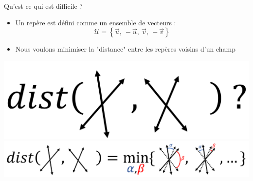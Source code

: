 \begin{frame}{Qu'est ce qui est difficile ?}
    \centering
    \small
    \begin{itemize}
     \item Un repère est défini comme un ensemble de vecteurs : $$\mathcal{U} = \left\{\vec{u},\ -\vec{u},\ \vec{v},\ -\vec{v}\right\}$$ 
     \item Nous voulons minimiser la "distance" entre les repères voisins d'un champ
     
   \end{itemize}
      \vspace*{0.5\baselineskip}
      
    \begin{overprint}
     \centering
    \includegraphics[width=0.6\linewidth]{img_spm_ff/dist_question.PNG}
     \centering
      \includegraphics[width=\linewidth]{img_spm_ff/dist_sol.PNG}
    
    \end{overprint}
    
    \normalsize
\end{frame}


